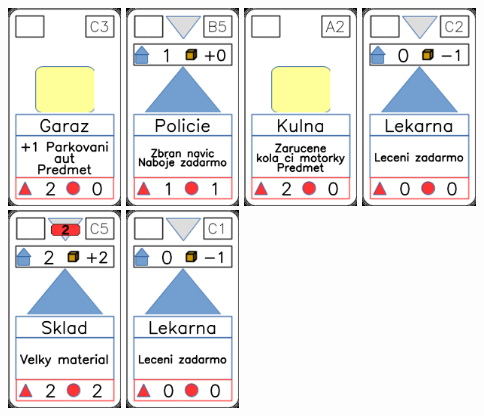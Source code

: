 \documentclass[a4paper]{article}
\begin{document}
	\includegraphics[width=3.0cm]{img-2_12}
	\includegraphics[width=3.0cm]{img-3_9}
	\includegraphics[width=3.0cm]{img-2_16}
	\includegraphics[width=3.0cm]{img-3_11}
	\includegraphics[width=3.0cm]{img-3_14}
	\includegraphics[width=3.0cm]{img-3_10}
\end{document}
